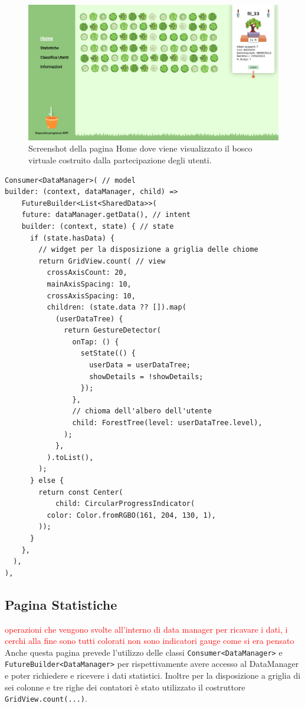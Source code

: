 \begin{figure}[h]
  \centering
  \includegraphics[width=\textwidth]{img/totem/screenshot/homepage.png}
  \caption{Screenshot della pagina Home dove viene visualizzato il bosco virtuale costruito dalla partecipazione degli utenti.}
  \label{fig:homepage}
\end{figure}

\newpage
\begin{lstlisting}[style=FlutterStyle, caption={Parte del codice per la creazione del bosco della Homepage}, label={lst:homepageCode}]
Consumer<DataManager>( // model
builder: (context, dataManager, child) =>
    FutureBuilder<List<SharedData>>(
    future: dataManager.getData(), // intent
    builder: (context, state) { // state 
      if (state.hasData) {
        // widget per la disposizione a griglia delle chiome
        return GridView.count( // view
          crossAxisCount: 20,
          mainAxisSpacing: 10,
          crossAxisSpacing: 10,
          children: (state.data ?? []).map(
            (userDataTree) {
              return GestureDetector(
                onTap: () {
                  setState(() {
                    userData = userDataTree;
                    showDetails = !showDetails;
                  });
                },
                // chioma dell'albero dell'utente
                child: ForestTree(level: userDataTree.level),
              );
            },
          ).toList(),
        );
      } else {
        return const Center(
            child: CircularProgressIndicator(
          color: Color.fromRGBO(161, 204, 130, 1),
        ));
      }
    },
  ),
),
\end{lstlisting}
%
%
\subsection{Pagina Statistiche}
\textcolor{red}{ operazioni che vengono svolte all'interno di data manager per ricavare i dati, i cerchi alla fine sono tutti colorati non sono indicatori gauge come si era pensato}
Anche questa pagina prevede l'utilizzo delle classi \texttt{Consumer<DataManager>} e \texttt{FutureBuilder<DataManager>} per rispettivamente avere accesso al DataManager e poter richiedere e ricevere i dati statistici. Inoltre per la disposizione a griglia di sei colonne e tre righe dei contatori è stato utilizzato il costruttore \texttt{GridView.count(...)}.
